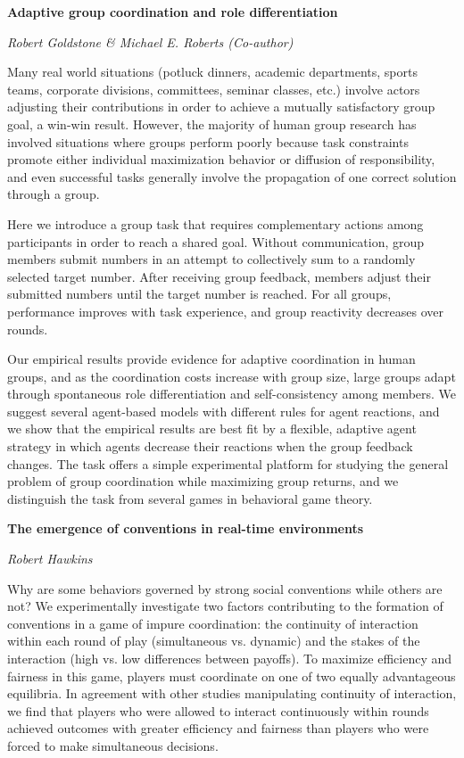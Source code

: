\documentclass[10pt,letterpaper]{article}
\begin{document}
\begin{center}\textbf{Adaptive group coordination and role differentiation}\end{center}
\begin{center}\emph{Robert Goldstone \& Michael E. Roberts (Co-author)}\end{center}

Many real world situations (potluck dinners, academic departments, sports teams, corporate divisions, committees, seminar classes, etc.) involve actors adjusting their contributions in order to achieve a mutually satisfactory group goal, a win-win result.  However, the majority of human group research has involved situations where groups perform poorly because task constraints promote either individual maximization behavior or diffusion of responsibility, and even successful tasks generally involve the propagation of one correct solution through a group.  

Here we introduce a group task that requires complementary actions among participants in order to reach a shared goal.  Without communication, group members submit numbers in an attempt to collectively sum to a randomly selected target number.  After receiving group feedback, members adjust their submitted numbers until the target number is reached.  For all groups, performance improves with task experience, and group reactivity decreases over rounds.  

Our empirical results provide evidence for adaptive coordination in human groups, and as the coordination costs increase with group size, large groups adapt through spontaneous role differentiation and self-consistency among members.  We suggest several agent-based models with different rules for agent reactions, and we show that the empirical results are best fit by a flexible, adaptive agent strategy in which agents decrease their reactions when the group feedback changes.  The task offers a simple experimental platform for studying the general problem of group coordination while maximizing group returns, and we distinguish the task from several games in behavioral game theory.

\begin{center}\textbf{The emergence of conventions in real-time environments}\end{center}
\begin{center}\emph{Robert Hawkins}\end{center}

Why are some behaviors governed by strong social conventions while others are not? We experimentally investigate two factors contributing to the formation of conventions in a game of impure coordination: the continuity of interaction within each round of play (simultaneous vs. dynamic) and the stakes of the interaction (high vs. low differences between payoffs). To maximize efficiency and fairness in this game, players must coordinate on one of two equally advantageous equilibria. In agreement with other studies manipulating continuity of interaction, we find that players who were allowed to interact continuously within rounds achieved outcomes with greater efficiency and fairness than players who were forced to make simultaneous decisions. 
\end{document}

